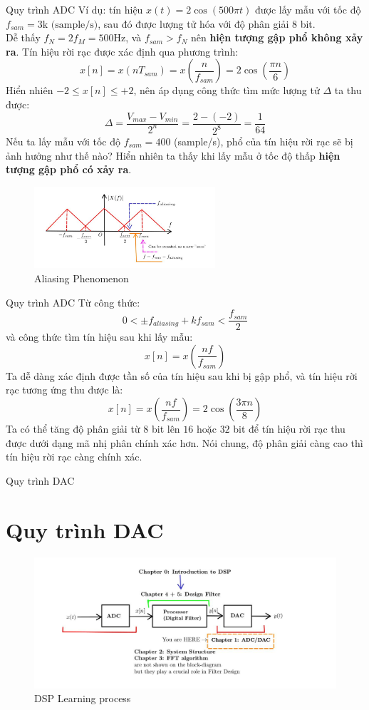 \documentclass[8pt]{beamer}
\begin{document}
\begin{frame}{Quy trình ADC}
	Ví dụ: tín hiệu $x(t)=2\cos{(500\pi t)}$ được lấy mẫu với \alert{tốc độ} $f_{sam}=3\text{k (sample/s)}$, sau đó được lượng tử hóa với độ phân giải $8$ bit. 
	\\ Dễ thấy $f_{N}=2f_{M}=500\text{Hz}$, và $f_{sam}>f_{N}$ nên \textbf{hiện tượng gập phổ không xảy ra}. Tín hiệu rời rạc được xác định qua phương trình:
	$$x[n]=x(nT_{sam})=x\left(\frac{n}{f_{sam}}\right)=2\cos\left(\frac{\pi n}{6}\right)$$
Hiển nhiên $-2\leq x[n]\leq +2$, nên áp dụng công thức tìm mức lượng tử $\Delta$ ta thu được:
$$\Delta=\frac{V_{max}-V_{min}}{2^{n}}=\frac{2-(-2)}{2^{8}}=\frac{1}{64}$$
Nếu ta lấy mẫu với \alert{tốc độ} $f_{sam}=400$ (sample/s), phổ của tín hiệu rời rạc sẽ bị ảnh hưởng như thế nào? Hiển nhiên ta thấy khi lấy mẫu ở tốc độ thấp \textbf{hiện tượng gập phổ có xảy ra}.
\begin{figure}[h]
			\includegraphics[width=0.6\textwidth]{9.jpg}
			\caption{Aliasing Phenomenon}			\label{fig:re8}
		\end{figure}
\end{frame}
\begin{frame}{Quy trình ADC}
	Từ công thức: $$0<\pm f_{aliasing}+k f_{sam}<\frac{f_{sam}}{2}$$ 
	và công thức tìm tín hiệu sau khi lấy mẫu: $$x[n]=x\left(\frac{nf}{f_{sam}}\right)$$
Ta dễ dàng xác định được tần số của tín hiệu sau khi bị gập phổ, và tín hiệu rời rạc tương ứng thu được là:
$$x[n]=x\left(\frac{nf}{f_{sam}}\right)=2\cos\left(\frac{3\pi n}{8}\right)$$
Ta có thể tăng độ phân giải từ $8$ bit lên $16$ hoặc $32$ bit để tín hiệu rời rạc thu được dưới dạng mã nhị phân chính xác hơn. Nói chung, độ phân giải càng cao thì tín hiệu rời rạc càng chính xác. 
\end{frame}
\begin{frame}{Quy trình DAC}
	\section{Quy trình DAC}
\begin{figure}[h]
			\includegraphics[width=1.1\textwidth]{7.jpg}
			\caption{DSP Learning process}			\label{fig:re8}
		\end{figure}

\end{frame}
\end{document}
